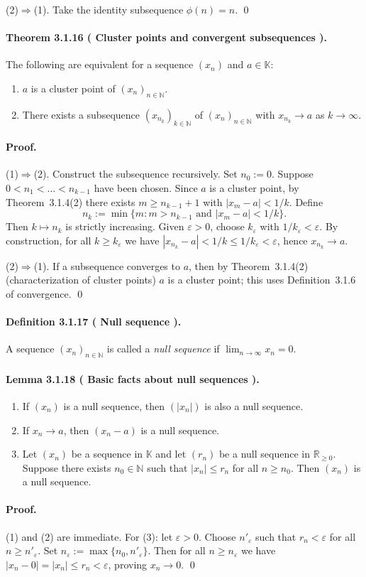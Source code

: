 \documentclass[12pt]{article}
\newcommand{\N}{\mathbb{N}}
\newcommand{\R}{\mathbb{R}}
\newcommand{\K}{\mathbb{K}} %
\newcommand{\eps}{\varepsilon}
\newcommand{\NumberedDefinition}[3]{%
\paragraph*{Definition #1 ( #2 ).} #3\par}
\newcommand{\NumberedTheorem}[3]{%
\paragraph*{Theorem #1 ( #2 ).} #3\par}
\newcommand{\NumberedLemma}[3]{%
\paragraph*{Lemma #1 ( #2 ).} #3\par}
\begin{document}
(2)$\Rightarrow$(1). Take the identity subsequence $\phi(n)=n$. \qed

\NumberedTheorem{3.1.16}{Cluster points and convergent subsequences}{The following are equivalent for a sequence $(x_n)$ and $a\in\K$:
\begin{enumerate}[label={(\arabic*)}, leftmargin=*]
	\item $a$ is a cluster point of $(x_n)_{n\in\N}$.
	\item There exists a subsequence $(x_{n_k})_{k\in\N}$ of $(x_n)_{n\in\N}$ with $x_{n_k}\to a$ as $k\to\infty$.
\end{enumerate}}

\paragraph{Proof.} (1)$\Rightarrow$(2). Construct the subsequence recursively. Set $n_0:=0$. Suppose $0<n_1<\dots<n_{k-1}$ have been chosen. Since $a$ is a cluster point, by Theorem~3.1.4(2) there exists $m\ge n_{k-1}+1$ with $|x_m-a|<1/k$. Define
\[
	n_k := \min\{ m : m>n_{k-1} \text{ and } |x_m-a|< 1/k\}.
\]
Then $k\mapsto n_k$ is strictly increasing. Given $\eps>0$, choose $k_\eps$ with $1/k_\eps<\eps$. By construction, for all $k\ge k_\eps$ we have $|x_{n_k}-a|<1/k\le 1/k_\eps<\eps$, hence $x_{n_k}\to a$.

(2)$\Rightarrow$(1). If a subsequence converges to $a$, then by Theorem~3.1.4(2) (characterization of cluster points) $a$ is a cluster point; this uses Definition~3.1.6 of convergence. \qed

\NumberedDefinition{3.1.17}{Null sequence}{A sequence $(x_n)_{n\in\N}$ is called a \emph{null sequence} if $\lim_{n\to\infty} x_n=0$.}

\NumberedLemma{3.1.18}{Basic facts about null sequences}{
\begin{enumerate}[label={(\arabic*)}, leftmargin=*]
	\item If $(x_n)$ is a null sequence, then $(|x_n|)$ is also a null sequence.
	\item If $x_n\to a$, then $(x_n-a)$ is a null sequence.
	\item Let $(x_n)$ be a sequence in $\K$ and let $(r_n)$ be a null sequence in $\R_{\ge0}$. Suppose there exists $n_0\in\N$ such that $|x_n|\le r_n$ for all $n\ge n_0$. Then $(x_n)$ is a null sequence.
\end{enumerate}}

\paragraph{Proof.} (1) and (2) are immediate. For (3): let $\eps>0$. Choose $n'_\eps$ such that $r_n<\eps$ for all $n\ge n'_\eps$. Set $n_\eps:=\max\{n_0,n'_\eps\}$. Then for all $n\ge n_\eps$ we have $|x_n-0|=|x_n|\le r_n<\eps$, proving $x_n\to0$. \qed
\end{document}
